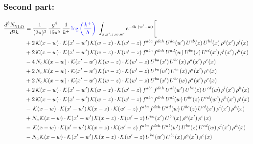 \documentclass[9pt]{article}
\numberwithin{equation}{section}
\begin{document}
\subsubsection{Second part:}
\begin{align}
\frac{d^{3}N_{\rm NLO}^{\rm}}{d^{3}k}  & = \frac{1}{(2\pi)^{3}}\,\frac{g^{4}}{16\pi^{5}}\,\frac{1}{k^{+}}\,{\color{blue}\log{\left(\frac{k^{+}}{\Lambda}\right)}}\,\,\int_{x,x',z,w,w'}e^{-ik\cdot(w'-w)}\Bigg[\notag\\ &+2\,\mathcal{K}(x-w)\cdot\mathcal{K}(x'-w')\,\mathcal{K}(w-z)\cdot\mathcal{K}(w'-z)\,f^{abc}\,f^{deh}\,U^{da}(w')\,U^{eb}(z)\,U^{hl}(x)\,\rho^{c}(x')\,\rho^{l}(x)\notag\\
&+2\,\mathcal{K}(x-w)\cdot\mathcal{K}(x'-w')\,\mathcal{K}(w-z)\cdot\mathcal{K}(w'-z)\,f^{abc}\,f^{deh}\,U^{ad}(w)\,U^{be}(z)\,U^{cl}(x')\,\rho^{l}(x')\,\rho^{h}(x)\notag\\
&-4\,N_{c}\,\mathcal{K}(x-w)\cdot\mathcal{K}(x'-w')\,\mathcal{K}(w-z)\cdot\mathcal{K}(w'-z)\,U^{ba}(x')\,U^{bc}(x)\,\rho^{a}(x')\,\rho^{c}(x)\notag\\
&+2\,N_{c}\,\mathcal{K}(x-w)\cdot\mathcal{K}(x'-w')\,\mathcal{K}(w-z)\cdot\mathcal{K}(w'-z)\,U^{ba}(w')\,U^{bc}(x)\,\rho^{a}(x')\,\rho^{c}(x)\notag\\
&+2\,N_{c}\,\mathcal{K}(x-w)\cdot\mathcal{K}(x'-w')\,\mathcal{K}(w-z)\cdot\mathcal{K}(w'-z)\,U^{ba}(x')\,U^{bc}(w)\,\rho^{a}(x')\,\rho^{c}(x)\notag\\
&+2\,\mathcal{K}(x-w)\cdot\mathcal{K}(x'-w')\,\mathcal{K}(w-z)\cdot\mathcal{K}(w'-z)\,f^{abc}\,f^{deh}\,U^{al}(w')\,U^{be}(z)\,U^{cd}(w)\,\rho^{l}(x')\,\rho^{h}(x)\notag\\
&+2\,\mathcal{K}(x-w)\cdot\mathcal{K}(x'-w')\,\mathcal{K}(w-z)\cdot\mathcal{K}(w'-z)\,f^{abc}\,f^{deh}\,U^{al}(w)\,U^{be}(z)\,U^{cd}(w')\,\rho^{h}(x')\,\rho^{l}(x)\notag\\
&-\,\mathcal{K}(x-w)\cdot\mathcal{K}(x'-w')\,\mathcal{K}(x-z)\cdot\mathcal{K}(w'-z)\,f^{abc}\,f^{deh}\,U^{ad}(w)\,U^{be}(z)\,U^{cl}(x')\,\rho^{l}(x')\,\rho^{h}(x)\notag\\
&+N_{c}\,\mathcal{K}(x-w)\cdot\mathcal{K}(x'-w')\,\mathcal{K}(x-z)\cdot\mathcal{K}(w'-z)\,U^{ba}(x')\,U^{bc}(x)\,\rho^{a}(x')\,\rho^{c}(x)\notag\\
&-\,\mathcal{K}(x-w)\cdot\mathcal{K}(x'-w')\,\mathcal{K}(x-z)\cdot\mathcal{K}(w'-z)\,f^{abc}\,f^{deh}\,U^{al}(w')\,U^{be}(z)\,U^{cd}(w)\,\rho^{l}(x')\,\rho^{h}(x)\notag\\
&-N_{c}\,\mathcal{K}(x-w)\cdot\mathcal{K}(x'-w')\,\mathcal{K}(x-z)\cdot\mathcal{K}(w'-z)\,U^{ba}(w')\,U^{bc}(x)\,\rho^{a}(x')\,\rho^{c}(x)\notag\\

\end{align}
\end{document}
